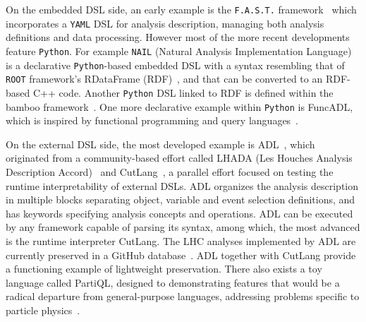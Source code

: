 \documentclass[11pt]{article}
\begin{document}
On the embedded \gls{DSL} side, an early example is the \texttt{F.A.S.T.} framework~\cite{FAST} which incorporates a \texttt{YAML} \gls{DSL} for analysis description, managing both analysis definitions and data processing. However most of the more recent developments feature \texttt{Python}. For example \texttt{NAIL} (Natural Analysis Implementation Language)~\cite{NAIL} is a declarative \texttt{Python}-based embedded \gls{DSL} with a syntax resembling that of \texttt{ROOT} framework's RDataFrame (RDF)~\cite{enrico_guiraud_2017_260230}, and that can be converted to an RDF-based C++ code.  Another \texttt{Python} \gls{DSL} linked to RDF is defined within the bamboo framework~\cite{David:2021ohq}.  One more declarative example within \texttt{Python} is FuncADL, which is inspired by functional programming and query languages~\cite{Proffitt:2021wfh}.

On the external \gls{DSL} side, the most developed example is \gls{ADL}~\cite{adlweb, Unel:2021edl}, which originated from a community-based effort called LHADA (Les Houches Analysis Description Accord)~\cite{Brooijmans:2016vro} and CutLang~\cite{Sekmen:2018ehb}, a parallel effort focused on testing the runtime interpretability of external \glspl{DSL}. \gls{ADL} organizes the analysis description in multiple blocks separating object, variable and event selection definitions, and has keywords specifying analysis concepts and operations. 
\gls{ADL} can be executed by any framework capable of parsing its syntax, among which, the most advanced is the runtime interpreter CutLang. The \gls{LHC} analyses implemented by \gls{ADL} are currently preserved in a GitHub database~\cite{adllhcanl}. \gls{ADL} together with CutLang provide a functioning example of lightweight preservation. There also exists a toy language called PartiQL, designed to demonstrating features that would be a radical departure from general-purpose languages, addressing problems specific to particle physics~\cite{PartiQL}. 
\end{document}
